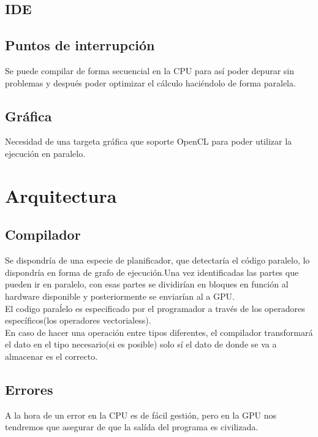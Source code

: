 \documentclass[12pt,a4paper]{article}
\begin{document}
\subsection{IDE}
\subsection{Puntos de interrupción}
Se puede compilar de forma secuencial en la CPU para así poder depurar sin problemas y después poder optimizar el cálculo haciéndolo de forma paralela.
\subsection{Gráfica}
Necesidad de una targeta gráfica que soporte OpenCL para poder utilizar la ejecución en paralelo.
\section{Arquitectura}
\subsection{Compilador}
Se dispondría de una especie de planificador, que detectaría el código paralelo, lo dispondría en forma de grafo de ejecución.Una vez identificadas las partes que pueden ir en paralelo, con esas partes se dividirían en bloques en función al hardware disponible y posteriormente se enviarían al a GPU.\\
El codigo paraĺelo es especificado por el programador a través de los operadores específicos(los operadores vectorialess).\\
En caso de hacer una operación entre tipos diferentes, el compilador transformará el dato en el tipo necesario(si es posible) solo sí el dato de donde se va a almacenar es el correcto.
\subsection{Errores}
A la hora de un error en la CPU es de fácil gestión, pero en la GPU nos tendremos que asegurar de que la salída del programa es civilizada.
\end{document}
